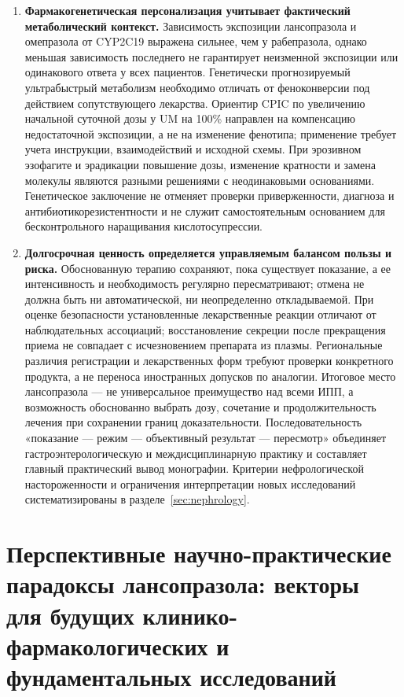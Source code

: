 \documentclass[11pt,a4paper,notitlepage]{report}
\newcommand{\src}[1]{\unskip\space\cite{#1}}
\begin{document}
\begin{enumerate}[label=\textbf{\arabic*.},leftmargin=*,itemsep=0.7\baselineskip]
\item \textbf{Фармакогенетическая персонализация учитывает фактический метаболический контекст.} Зависимость экспозиции лансопразола и омепразола от CYP2C19 выражена сильнее, чем у рабепразола, однако меньшая зависимость последнего не гарантирует неизменной экспозиции или одинакового ответа у всех пациентов. Генетически прогнозируемый ультрабыстрый метаболизм необходимо отличать от феноконверсии под действием сопутствующего лекарства. Ориентир CPIC по увеличению начальной суточной дозы у UM на 100\% направлен на компенсацию недостаточной экспозиции, а не на изменение фенотипа; применение требует учета инструкции, взаимодействий и исходной схемы. При эрозивном эзофагите и эрадикации повышение дозы, изменение кратности и замена молекулы являются разными решениями с неодинаковыми основаниями. Генетическое заключение не отменяет проверки приверженности, диагноза и антибиотикорезистентности и не служит самостоятельным основанием для бесконтрольного наращивания кислотосупрессии.\src{leonova2015,cpic,molfluvox,asge2025,acghp}

\item \textbf{Долгосрочная ценность определяется управляемым балансом пользы и риска.} Обоснованную терапию сохраняют, пока существует показание, а ее интенсивность и необходимость регулярно пересматривают; отмена не должна быть ни автоматической, ни неопределенно откладываемой. При оценке безопасности установленные лекарственные реакции отличают от наблюдательных ассоциаций; восстановление секреции после прекращения приема не совпадает с исчезновением препарата из плазмы. Региональные различия регистрации и лекарственных форм требуют проверки конкретного продукта, а не переноса иностранных допусков по аналогии. Итоговое место лансопразола --- не универсальное преимущество над всеми ИПП, а возможность обоснованно выбрать дозу, сочетание и продолжительность лечения при сохранении границ доказательности. Последовательность «показание --- режим --- объективный результат --- пересмотр» объединяет гастроэнтерологическую и междисциплинарную практику и составляет главный практический вывод монографии. Критерии нефрологической настороженности и ограничения интерпретации новых исследований систематизированы в разделе~\ref{sec:nephrology}.\src{agadepres,kidney,uslabel,molrestore,withdrawbell,emc,grls}
\end{enumerate}

\section{Перспективные научно-практические парадоксы лансопразола: векторы для будущих клинико-фармакологических и фундаментальных исследований}
\label{sec:research-agenda}
\end{document}
